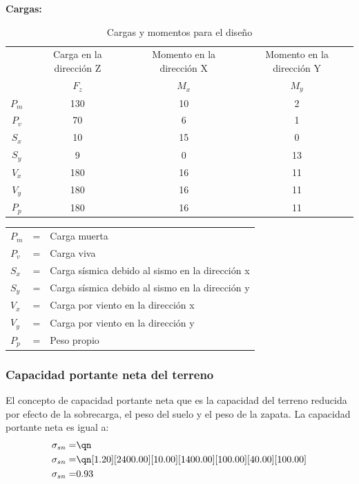 \documentclass{article}%
\begin{document}
\textbf{Cargas:}


\begin{table}[h!]
    \centering
    \begin{tabular}{cccc} \toprule
         & Carga en la dirección Z & Momento en la dirección X & Momento en la dirección Y  \\ 
         & $F_z$ & $M_x $ & $M_y$ \\ \midrule
        $P_m$ & 130& 10 & 2 \\
        $P_v$ & 70 & 6 & 1 \\
        $S_x$ & 10 & 15 & 0 \\
        $S_y$ & 9 & 0 & 13 \\
        $V_x$ & 180 & 16 & 11 \\
        $V_y$ & 180 & 16 & 11 \\
        $P_p$ & 180 & 16 & 11 \\\bottomrule
    \end{tabular}
    \caption{Cargas y momentos para el diseño}
    \label{tab:my_label}
\end{table}

\begin{table}[h!]
    \centering
    \begin{tabular}{lll}
        $P_m$ &=&   Carga muerta\\
        $P_v$ &=&   Carga viva\\
        $S_x$ &=&   Carga sísmica debido al sismo en la dirección x\\
        $S_y$ &=&   Carga sísmica debido al sismo en la dirección y\\
        $V_x$ &=&   Carga por viento en la dirección x\\
        $V_y$ &=&   Carga por viento en la dirección y\\
        $P_p$ &=&   Peso propio\\
    \end{tabular}
\end{table}

%
\subsubsection{Capacidad portante neta del terreno}

    El concepto de capacidad portante neta que es la capacidad del terreno reducida por efecto de la sobrecarga, el peso del suelo y el peso de la zapata. La capacidad portante neta es igual a:
    \begin{align}
        \sigma_{sn} =&\qn \\
        \sigma_{sn} =&\qn[1.20][2400.00][10.00][1400.00][100.00][40.00][100.00]\\
        \sigma_{sn} =& 0.93
    \end{align}
\end{document}
